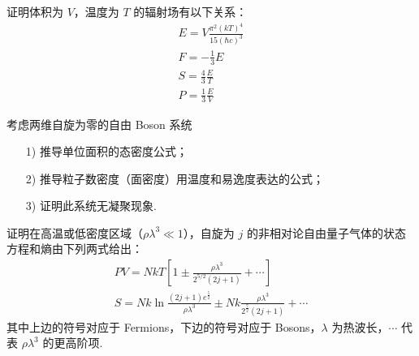 \documentclass{assignment}
\begin{document}
\begin{prob}
    证明体积为 $V$，温度为 $T$ 的辐射场有以下关系：
    \begin{gather*}
        E=V\frac{\pi^2(kT)^4}{15(\hbar c)^3}\\
        F=-\frac{1}{3}E\\
        S=\frac{4}{3}\frac{E}{T}\\
        P=\frac{1}{3}\frac{E}{V}
    \end{gather*}
\end{prob}
\begin{pf}
    
\end{pf}

\begin{prob}
    考虑两维自旋为零的自由 Boson 系统
    \begin{itemize}
        \item[1)] 推导单位面积的态密度公式；
        \item[2)] 推导粒子数密度（面密度）用温度和易逸度表达的公式；
        \item[3)] 证明此系统无凝聚现象.
    \end{itemize}
\end{prob}
\begin{sol}
    
\end{sol}

\begin{prob}
    证明在高温或低密度区域（$\rho\lambda^3\ll 1$），自旋为 $j$ 的非相对论自由量子气体的状态方程和熵由下列两式给出：
    \begin{gather*}
        PV=NkT\left[1\pm\frac{\rho\lambda^3}{2^{5/2}(2j+1)}+\cdots\right]\\
        S=Nk\ln\frac{(2j+1)e^{\frac{5}{2}}}{\rho\lambda^3}\pm Nk\frac{\rho\lambda^3}{2^{\frac{7}{2}}(2j+1)}+\cdots
    \end{gather*}
    其中上边的符号对应于 Fermions，下边的符号对应于 Bosons，$\lambda$ 为热波长，$\cdots$ 代表 $\rho\lambda^3$ 的更高阶项.
\end{prob}
\begin{pf}
    
\end{pf}
\end{document}
